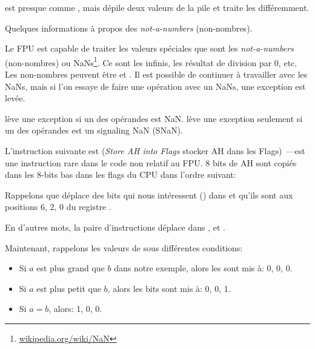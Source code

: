 



\FUCOMPP{} est presque comme \FCOM, mais dépile deux valeurs de la pile et traite
les  différemment.

Quelques informations à propos des \emph{not-a-numbers} (non-nombres).

\newcommand{\NANFN}{\footnote{\href{http://go.yurichev.com/17130}{wikipedia.org/wiki/NaN}}}

Le FPU est capable de traiter les valeurs spéciales que sont les \emph{not-a-numbers}
(non-nombres) ou \gls{NaN}s\NANFN.
Ce sont les infinis, les résultat de division par 0, etc.
Les non-nombres peuvent être  et . Il est possible de continuer
à travailler avec les  NaNs, mais si l'on essaye de faire une opération avec
un  NaNs, une exception est levée.


\FCOM lève une exception si un des opérandes est \gls{NaN}.
\FUCOM lève une exception seulement si un des opérandes est un signaling \gls{NaN}
(SNaN).

\label{SAHF}

L'instruction suivante est \SAHF (\emph{Store AH into Flags} stocker AH dans les Flags)~---est
une instruction rare dans le code non relatif au FPU.
8 bits de AH sont copiés dans les 8-bits bas dans les flags du CPU dans l'ordre suivant:




Rappelons que \FNSTSW déplace des bits qui nous intéressent (\CThreeBits) dans \AH
et qu'ils sont aux positions 6, 2, 0 du registre \AH.



En d'autres mots, la paire d'instructions  déplace \CThreeBits
dans \ZF, \PF et \CF.

Maintenant, rappelons les valeurs de \CThreeBits sous différentes conditions:

\begin{itemize}
\item Si $a$ est plus grand que $b$ dans notre exemple, alors les \CThreeBits sont
mis à: 0, 0, 0.
\item Si $a$ est plus petit que $b$, alors les bits sont mis à: 0, 0, 1.
\item Si $a=b$, alors: 1, 0, 0.
\end{itemize}


